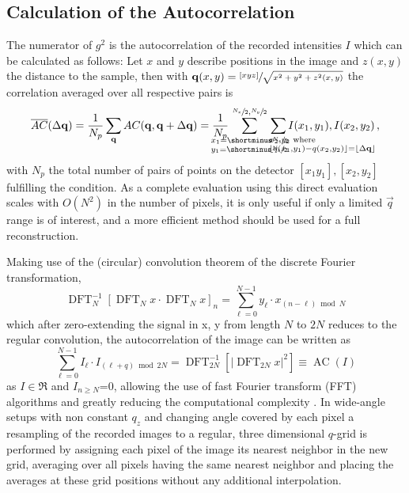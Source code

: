\subsection{Calculation of the Autocorrelation}
The numerator of $g^2$ is the autocorrelation of the recorded intensities $I$ which can be calculated as follows:
Let $x$ and $y$ describe positions in the image and $z(x,y)$ the distance to the sample, then 
with $\mathbf{q}(x,y) = \sfrac{[x y z]}{\sqrt{x ^ 2 + y ^ 2 + z^2(x,y)}}$  the correlation averaged over all respective pairs is
\begin{equation}
	\overline{AC}(\Delta \vec{q}) = 
	\frac{1}{N_p} \sum_{\vec{q}} AC(\vec{q},\vec{q}+\Delta \vec{q})=
	\frac{1}{N_p} \quad \sum^{	\crampedclap{\sfrac{N_x}{2},\sfrac{N_y}{2}}}_{
		\crampedclap{
			\begin{subarray}{l}
				x_1=\shortminus\sfrac{N_x}{2}\\
				y_1=\shortminus\sfrac{N_y}{2}
			\end{subarray}
	}}\quad
	\sum_{\crampedclap{\qquad\qquad\qquad\qquad
			\begin{subarray}{l}
				x_2,y_2 \text{ where} \\ \lfloor q(x_1,y_1)-q(x_2,y_2)\rfloor=\lfloor\Delta\vec{q}\rfloor
	\end{subarray}}}
	I(x_1,y_1),I(x_2,y_2) \,,
	\label{eq:correlation}
\end{equation}
with $N_p$ the total number of pairs of points on the detector $[x_1 y_1],[x_2,y_2]$  fulfilling the condition. As a complete evaluation using this direct evaluation scales with $O(N^2)$ in the number of pixels, it is only useful if only a limited $\vec{q}$ range is of interest, and a more efficient method should be used for a full reconstruction.

Making use of the (circular) convolution theorem of the discrete Fourier transformation,
\begin{equation}
	\operatorname{DFT}_N^{-1}\left[\operatorname{DFT}_N x \cdot \operatorname{DFT}_N x\right]_n=\sum_{\ell=0}^{N-1} y_{\ell} \cdot x_{(n-\ell) \bmod N}
\end{equation}
which after zero-extending the signal in x, y from length $N$ to $2N$ reduces to the regular convolution, the autocorrelation of the image can be written as 
\begin{equation}
	\sum_{\ell=0}^{N-1} I_{\ell} \cdot I_{(\ell+q) \bmod 2N}=\operatorname{DFT}_{2N}^{-1}\left[\left|\operatorname{DFT}_{2N} {x}\right|^2\right]\equiv \operatorname{AC}(I)
	\label{eq:fftcorrelation}
\end{equation} 
as $I\in \Re$ and $I_{n\geq N}$=0, allowing the use of fast Fourier transform (FFT) algorithms and greatly reducing the computational complexity \cite{oppenheim2009}.  In wide-angle setups with non constant $q_z$ and changing angle covered by each pixel a resampling of the recorded images to a regular, three dimensional $q$-grid is performed by assigning each pixel of the image its nearest neighbor in the new grid, averaging over all pixels having the same nearest neighbor and placing the averages at these grid positions without any additional interpolation. 

